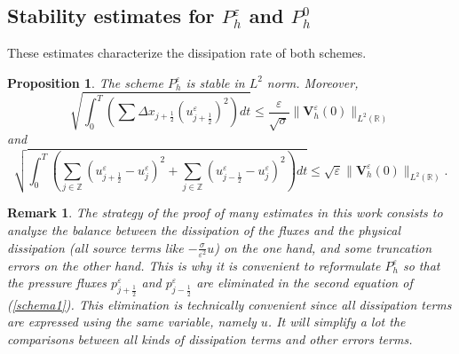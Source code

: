 \documentclass[a4paper,french,english,10pt]{article}
\newcommand\eps{\varepsilon}
\newcommand\V{\mathbf{V}}
\newtheorem{proposition}[theorem]{Proposition}
\newtheorem{remark}[theorem]{Remark}
\begin{document}
 \subsection{Stability  estimates for $P_h^\varepsilon$ and $P_h^0$}

These estimates characterize the dissipation rate 
of both schemes.

\begin{proposition}\label{prodentrgosse}
The  scheme $P_h^\eps$
is stable in $L^2$ norm. Moreover, 
\begin{equation}\label{estiuepsflux}
\sqrt{
\int_0^T \left( \sum \Delta x_{j+\frac12}  ( u_{j+\frac12 }^\eps)^2 \right)dt
}
\leq
\frac{\eps}{\sqrt{\sigma}}
 \|\V^{\eps}_h(0)\|_{L^2(\mathbb{R})}
\end{equation}
and
\begin{equation}\label{estiuepsflux2}
 \sqrt{
\int_0^T
\left(
\sum_{j\in \mathbb{Z}} 
{
(u_{j+\frac12 }^{\eps}-u^{\eps}_j)^2 }
 +\sum_{j\in \mathbb{Z}} 
{
(u_{j-\frac12 }^{\eps}-u^{\eps}_j)^2 }
\right)dt }
\leq \sqrt \eps  \|\V^{\eps}_h(0)\|_{L^2(\mathbb{R})}.
\end{equation}
\end{proposition}
\begin{remark}
The strategy of the proof of many estimates in this work
consists to analyze the balance
between the dissipation of the fluxes and the physical dissipation (all 
 source terms like 
$-\frac\sigma{\eps^2}u$) on the one hand, and some truncation errors
on the other hand.
This is why it is  convenient
to reformulate $P_h^\eps$
so that   the pressure fluxes 
$p_{j+\frac12 }^{\eps}$ and $p_{j-\frac12 }^{\eps}$ are eliminated in the second
equation of (\ref{schema1}). This elimination is technically convenient since
all dissipation terms are expressed using the same variable, namely $u$.
It will simplify a lot the comparisons between
all kinds of dissipation terms and other errors terms.
\end{remark}
\end{document}
